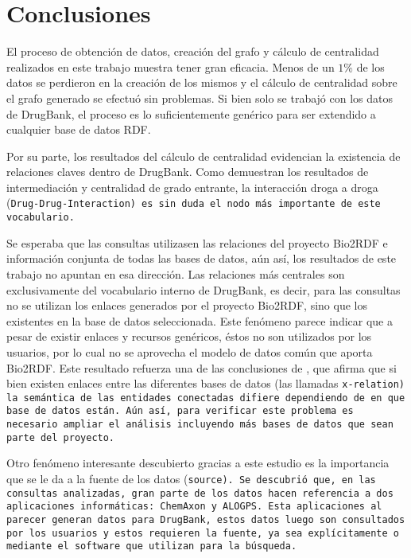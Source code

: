 \section{Conclusiones}\label{sec:con}
El proceso de obtención de datos, creación del grafo y cálculo de centralidad
realizados en este trabajo muestra tener gran eficacia. Menos de un $1\%$ de los
datos se perdieron en la creación de los mismos y el cálculo de centralidad
sobre el grafo generado se efectuó sin problemas. Si bien solo se trabajó con
los datos de DrugBank, el proceso es lo suficientemente genérico para ser
extendido a cualquier base de datos RDF.

Por su parte, los resultados del cálculo de centralidad evidencian la existencia
de relaciones claves dentro de DrugBank.
Como demuestran los resultados de intermediación y centralidad de grado
entrante, la interacción droga a droga (\tt{Drug-Drug-Interaction}) es sin duda
el nodo más importante de este vocabulario.

Se esperaba que las consultas utilizasen las relaciones del proyecto Bio2RDF e
información conjunta de todas las bases de datos, aún así, los resultados de
este trabajo no apuntan en esa dirección.
Las relaciones más centrales son exclusivamente del vocabulario interno de
DrugBank, es decir, para las consultas no se utilizan los enlaces generados por
el proyecto Bio2RDF, sino que los existentes en la base de datos seleccionada.
Este fenómeno parece indicar que a pesar de existir enlaces y recursos
genéricos, éstos no son utilizados por los usuarios, por lo cual no se
aprovecha el modelo de datos común que aporta Bio2RDF.
Este resultado refuerza una de las conclusiones de \cite{hu2015link}, que afirma
que si bien existen enlaces entre las diferentes bases de datos (las llamadas
\tt{x-relation}) la semántica de las entidades conectadas difiere dependiendo de
en que base de datos están.
Aún así, para verificar este problema es necesario ampliar el análisis
incluyendo más bases de datos que sean parte del proyecto.

Otro fenómeno interesante descubierto  gracias a este estudio es la importancia
que se le da a la fuente de los datos (\tt{source}).
Se descubrió que, en las consultas analizadas, gran parte de los datos hacen
referencia a dos aplicaciones informáticas: ChemAxon y ALOGPS.
Esta aplicaciones al parecer generan datos para DrugBank, estos datos luego son
consultados por los usuarios y estos requieren la fuente, ya sea explícitamente
o mediante el software que utilizan para la búsqueda.

